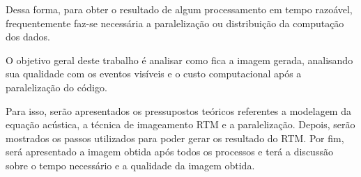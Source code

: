Dessa forma, para obter o resultado de algum processamento em tempo razoável, frequentemente faz-se necessária a paralelização ou distribuição da computação dos dados. 

 O objetivo geral deste trabalho é analisar como fica a imagem gerada, analisando sua qualidade com os eventos visíveis e o custo computacional após a paralelização do código.

Para isso, serão apresentados os pressupostos teóricos referentes a modelagem da equação acústica, a técnica de imageamento RTM e a paralelização. Depois, serão mostrados os passos utilizados para poder gerar os resultado do RTM. Por fim, será apresentado a imagem obtida após todos os processos e terá a discussão sobre o tempo necessário e a qualidade da imagem obtida.






